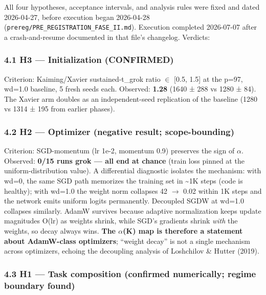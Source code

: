 \documentclass[
  11pt,
]{article}
\begin{document}
All four hypotheses, acceptance intervals, and analysis rules were fixed
and dated 2026-04-27, before execution began 2026-04-28
(\texttt{prereg/PRE\_REGISTRATION\_FASE\_II.md}). Execution completed
2026-07-07 after a crash-and-resume documented in that file's changelog.
Verdicts:

\subsubsection{4.1 H3 --- Initialization
(CONFIRMED)}\label{h3-initialization-confirmed}

Criterion: Kaiming/Xavier sustained-t\_grok ratio $\in$ {[}0.5, 1.5{]} at
the p=97, wd=1.0 baseline, 5 fresh seeds each. Observed: \textbf{1.28}
(1640 ± 288 vs 1280 ± 84). The Xavier arm doubles as an independent-seed
replication of the baseline (1280 vs 1314 ± 195 from earlier phases).

\subsubsection{4.2 H2 --- Optimizer (negative result;
scope-bounding)}\label{h2-optimizer-negative-result-scope-bounding}

Criterion: SGD-momentum (lr 1e-2, momentum 0.9) preserves the sign of $\alpha$.
Observed: \textbf{0/15 runs grok --- all end at chance} (train loss
pinned at the uniform-distribution value). A differential diagnostic
isolates the mechanism: with wd=0, the same SGD path memorizes the
training set in \textasciitilde1K steps (code is healthy); with wd=1.0
the weight norm collapses 42 $\to$ 0.02 within 1K steps and the network
emits uniform logits permanently. Decoupled SGDW at wd=1.0 collapses
similarly. AdamW survives because adaptive normalization keeps update
magnitudes O(lr) as weights shrink, while SGD's gradients shrink
\emph{with} the weights, so decay always wins. \textbf{The $\alpha$(K) map is
therefore a statement about AdamW-class optimizers}; ``weight decay'' is
not a single mechanism across optimizers, echoing the decoupling
analysis of Loshchilov \& Hutter (2019).

\subsubsection{4.3 H1 --- Task composition (confirmed numerically;
regime boundary
found)}\label{h1-task-composition-confirmed-numerically-regime-boundary-found}
\end{document}

